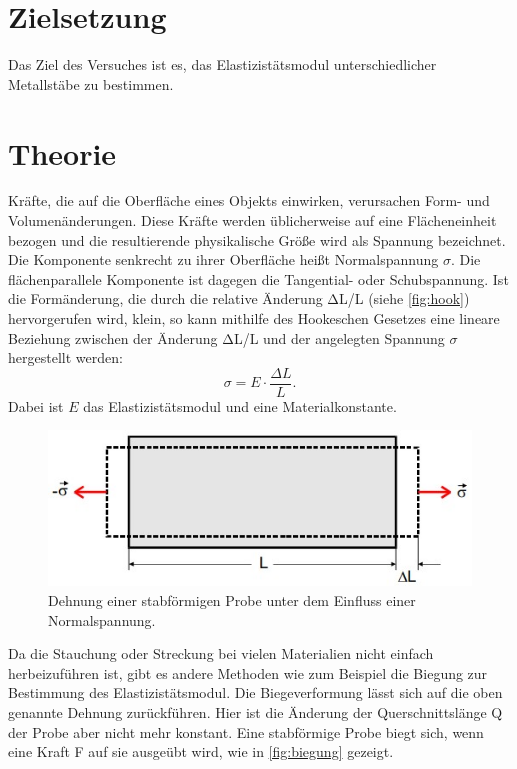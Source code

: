\section{Zielsetzung}
\label{sec:Zielsetzung}
Das Ziel des Versuches ist es, das Elastizistätsmodul unterschiedlicher Metallstäbe zu bestimmen.

\section{Theorie}
\label{sec:Theorie}

Kräfte, die auf die Oberfläche eines Objekts einwirken, verursachen Form- und Volumenänderungen. Diese Kräfte werden üblicherweise auf eine Flächeneinheit bezogen und die resultierende physikalische Größe wird als Spannung bezeichnet. 
Die Komponente senkrecht zu ihrer Oberfläche heißt Normalspannung $\sigma$.
Die flächenparallele Komponente ist dagegen die Tangential- oder Schubspannung. 
Ist die Formänderung, die durch die relative Änderung ΔL/L (siehe \autoref{fig:hook}) hervorgerufen wird, klein, so kann mithilfe des Hookeschen Gesetzes eine lineare Beziehung zwischen
der Änderung ΔL/L und der angelegten Spannung $\sigma$ hergestellt werden:
\begin{equation}\label{eq:hook}
    \sigma = E \cdot \frac{\Delta L}{L}.
\end{equation}
Dabei ist $E$ das Elastizistätsmodul und eine Materialkonstante.
\begin{figure}[H]
    \includegraphics[width=\linewidth]{img/abb1.jpg}
    \caption{Dehnung einer stabförmigen Probe unter dem Einfluss einer Normalspannung.\cite{V103}}
    \label{fig:hook}
\end{figure}
Da die Stauchung oder Streckung bei vielen Materialien nicht einfach herbeizuführen ist, gibt es andere Methoden wie zum Beispiel die 
Biegung zur Bestimmung des Elastizistätsmodul.
Die Biegeverformung lässt sich auf die oben genannte Dehnung zurückführen. Hier ist die Änderung der Querschnittslänge Q der Probe aber nicht mehr konstant. 
Eine stabförmige Probe biegt sich, wenn eine Kraft F auf sie ausgeübt wird, wie in \autoref{fig:biegung} gezeigt.
